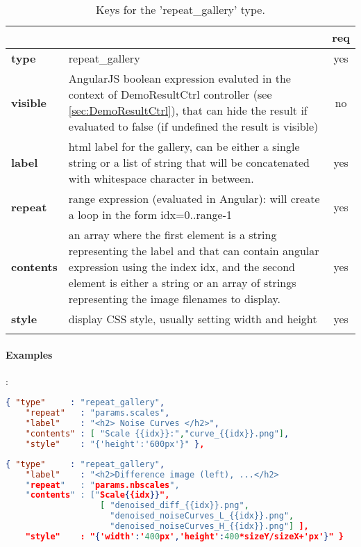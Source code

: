 \begin{longtable}{|>{\bf}L{\linewidth}|L{\linewidth}|c|}
\hline
{}     &  & {\bf req} \tabularnewline 
\hline \hline
 type       & repeat\_gallery  & yes \\ \hline
 visible    & AngularJS boolean expression evaluted in the context of DemoResultCtrl
              controller (see \ref{sec:DemoResultCtrl}), that can hide the result if
              evaluated to false (if undefined the result is visible)& no \\ \hline
 label      & html label for the gallery, can be either a single string or 
             a list of string that will be concatenated with whitespace character
              in between.& yes \\ \hline
 repeat     & range expression (evaluated in Angular):
              will create a loop in the form idx=0..range-1 & yes \\ \hline
 contents   & an array where the first element is a string representing the label
              and that can contain angular expression using the index idx, and
              the second element is either a string or an array of strings
              representing the image filenames to display. & yes \\ \hline
 style      & display CSS style, usually setting width and height& yes \\ \hline
\caption{Keys for the 'repeat\_gallery' type.}
\end{longtable}

\paragraph{Examples}:\\
\begin{lstlisting}[language=json,firstnumber=1]
  { "type"     : "repeat_gallery",
    "repeat"   : "params.scales",
    "label"    : "<h2> Noise Curves </h2>",
    "contents" : [ "Scale {{idx}}:","curve_{{idx}}.png"],
    "style"    : "{'height':'600px'}" },
\end{lstlisting}

\begin{lstlisting}[language=json,firstnumber=1]
  { "type"     : "repeat_gallery",
    "label"    : "<h2>Difference image (left), ...</h2> 
    "repeat"   : "params.nbscales",
    "contents" : ["Scale{{idx}}",
                   [ "denoised_diff_{{idx}}.png",
                     "denoised_noiseCurves_L_{{idx}}.png",
                     "denoised_noiseCurves_H_{{idx}}.png"] ],
    "style"    : "{'width':'400px','height':400*sizeY/sizeX+'px'}" }
\end{lstlisting}


